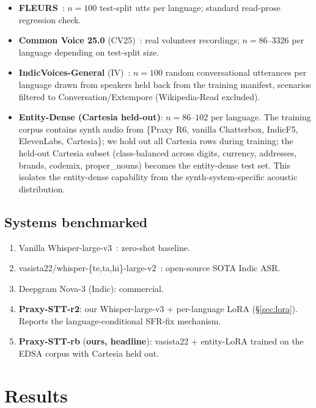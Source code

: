 \documentclass[conference,a4paper]{IEEEtran}
\begin{document}
\begin{itemize}
\item \textbf{FLEURS}~\cite{fleurs_2023}: $n=100$ test-split utts per language; standard read-prose regression check.
\item \textbf{Common Voice 25.0} (CV25)~\cite{commonvoice_25}: real volunteer recordings; $n=86$--$3326$ per language depending on test-split size.
\item \textbf{IndicVoices-General} (IV)~\cite{indicvoices_2024}: $n=100$ random conversational utterances per language drawn from speakers held back from the training manifest, scenarios filtered to Conversation/Extempore (Wikipedia-Read excluded).
\item \textbf{Entity-Dense (Cartesia held-out)}: $n=86$--$102$ per language. The training corpus contains synth audio from \{Praxy R6, vanilla Chatterbox, IndicF5, ElevenLabs, Cartesia\}; we hold out all Cartesia rows during training; the held-out Cartesia subset (class-balanced across digits, currency, addresses, brands, codemix, proper\_nouns) becomes the entity-dense test set. This isolates the entity-dense capability from the synth-system-specific acoustic distribution.
\end{itemize}

\subsection{Systems benchmarked}

\begin{enumerate}
\item Vanilla Whisper-large-v3~\cite{whisper_v3}: zero-shot baseline.
\item vasista22/whisper-\{te,ta,hi\}-large-v2~\cite{vasista22}: open-source SOTA Indic ASR.
\item Deepgram Nova-3 (Indic): commercial.
\item \textbf{Praxy-STT-r2}: our Whisper-large-v3 + per-language LoRA (\S\ref{sec:lora}). Reports the language-conditional SFR-fix mechanism.
\item \textbf{Praxy-STT-rb} (\textbf{ours, headline}): vasista22 + entity-LoRA trained on the EDSA corpus with Cartesia held out.
\end{enumerate}

\section{Results}\label{sec:results}
\end{document}
